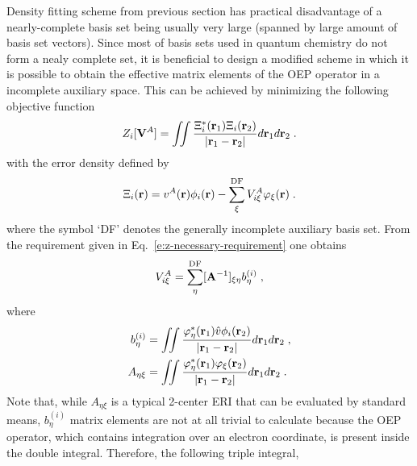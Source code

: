 Density fitting scheme from previous section has practical disadvantage of a nearly\hyp{}complete basis set
being usually very large (spanned by large amount of basis set vectors). 
Since most of basis sets used in quantum chemistry do not form a nealy complete
set, it is beneficial to design a modified scheme in which it is possible to obtain the effective 
matrix elements of the OEP operator in a incomplete auxiliary space. This can be achieved by minimizing 
the following objective function
%
\begin{equation} \label{e:z-incompl}
	Z_i[{\bf V}^A] = \iint 
        \frac{ \Xi_i^*({\bf r}_1) \Xi_i({\bf r}_2) }{\vert {\bf r}_1 - {\bf r}_2 \vert}  
         d{\bf r}_1 d{\bf r}_2  \;.
\end{equation}
%
with the error density defined by
%
\begin{equation}
 \Xi_i({\bf r}) = v^A({\bf r}) \phi_i({\bf r}) - \sum_\xi^{\rm DF} V^A_{i\xi} \varphi_\xi({\bf r}) \;.
\end{equation}
%
where the symbol `DF' denotes the generally incomplete auxiliary basis set.
From the requirement given in Eq.~\eqref{e:z-necessary-requirement}
one obtains
%
\begin{equation} \label{e:v-noncompl}
  V^A_{i\xi} = \sum_\eta^{\rm DF} [{\bf A}^{-1}]_{\xi\eta} b^{(i)}_\eta \;,
\end{equation}
%
where 
%
\begin{subequations}
\begin{align}
 b^{(i)}_\eta &= \iint 
                       \frac{ \varphi^*_\eta({\bf r}_1) \hat{v} \phi_i({\bf r}_2) } 
                            {\vert {\bf r}_1 - {\bf r}_2\vert}  
                 d{\bf r}_1 d{\bf r}_2 \;, \\
 A_{\eta\xi}  &= \iint 
                       \frac{ \varphi^*_\eta({\bf r}_1) \varphi_\xi({\bf r}_2) } 
                            {\vert {\bf r}_1 - {\bf r}_2\vert}  
                 d{\bf r}_1 d{\bf r}_2 \;.
\end{align}
\end{subequations}
%
Note that, while $A_{\eta\xi}$ is a typical 2\hyp{}center ERI 
that can be evaluated by standard means,
$b^{(i)}_\eta$ matrix elements are not at all trivial to calculate
because the OEP operator, which contains integration over an electron coordinate,
is present inside the double integral. Therefore, the following triple integral,
